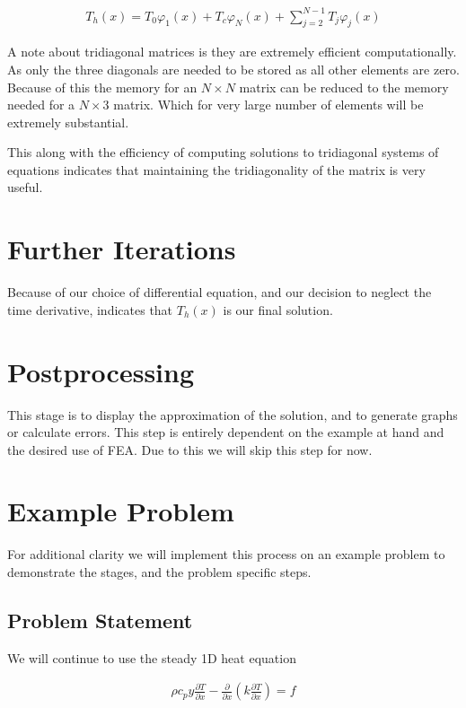 \documentclass[10pt]{amsart}
\numberwithin{equation}{section}
\theoremstyle{definition}
\newcommand{\pder}[2][]{\frac{\partial#1}{\partial#2}}
\begin{document}
\begin{multicols}{2}
\begin{align}
  T_h(x) = T_0\varphi_1(x)+T_c\varphi_N(x)+\sum_{j=2}^{N-1}T_j\varphi_j(x)
\end{align}

A note about tridiagonal matrices is they are extremely efficient
computationally. As only the three diagonals are needed to be stored as all
other elements are zero. Because of this the memory for an $N\times N$ matrix
can be reduced to the memory needed for a $N\times 3$ matrix. Which for very
large number of elements will be extremely substantial.

This along with the efficiency of computing solutions to tridiagonal systems of
equations indicates that maintaining the tridiagonality of the matrix is very
useful.

\section{Further Iterations}%
\label{sec:further_iterations}

Because of our choice of differential equation, and our decision to neglect the
time derivative, indicates that $T_h(x)$ is our final solution.

\section{Postprocessing}%
\label{sec:postprocessing}

This stage is to display the approximation of the solution, and to generate
graphs or calculate errors. This step is entirely dependent on the example at
hand and the desired use of FEA. Due to this we will skip this step for now.

\section{Example Problem}%
\label{sec:example_problem}

For additional clarity we will implement this process on an example problem to
demonstrate the stages, and the problem specific steps.

\subsection{Problem Statement}%
\label{sub:problem_statement}

We will continue to use the steady 1D heat equation

\begin{align*}
  \rho c_p y\pder[T]{x}-\pder{x}\left(k\pder[T]{x}\right)=f
\end{align*}


\end{multicols}
\end{document}
